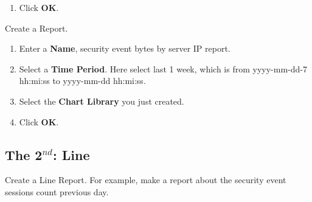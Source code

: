 \begin{description}
\begin{enumerate}
        \item	Click \textbf{OK}.
    \end{enumerate}
    \item[STEP 3.]	Create a Report.
    \begin{enumerate}
        \item	Enter a \textbf{Name}, security event bytes by server IP report.
        \item	Select a \textbf{Time Period}. Here select last 1 week, which is from yyyy-mm-dd-7 hh:mi:ss to yyyy-mm-dd hh:mi:ss.
        \item	Select the \textbf{Chart Library} you just created. 
        \item	Click \textbf{OK}.
    \end{enumerate}
\end{description}

\subsection*{\hypertarget{link:The 2nd: Line}{The 2$^{nd}$: Line}}
\label{sec:appendix_f:report:line}

Create a Line Report. For example, make a report about the security event sessions count previous day.

